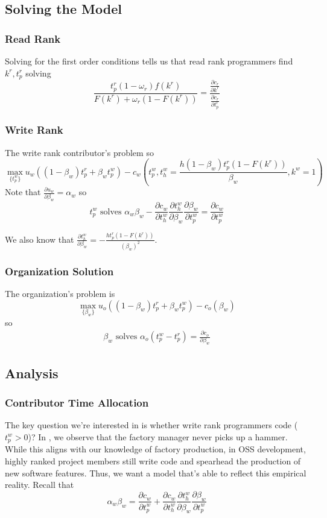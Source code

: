 \documentclass[source/paper/main.tex]{subfiles}
\begin{document}
\subsection{Solving the Model}
\subsubsection{Read Rank}
Solving for the first order conditions tells us that read rank programmers find $k^r, t_p^r$ solving 
$$\frac{t_p^r(1-\omega_r)f(k^r)}{F(k^r) + \omega_r(1-F(k^r)) } = \frac{\frac{\partial c_r}{\partial k^r}}{\frac{\partial c_r}{\partial t_p^r}}$$
\subsubsection{Write Rank}
The write rank contributor's problem so
$$\max_{\{t_p^w\}} u_w\left((1-\beta_w) t_p^r + \beta_w t_p^w \right) - c_w\left(t_p^w, t_h^w = \frac{ h (1-\beta_w) t_p^r(1-F(k^r))}{\beta_w}, k^w = 1\right)$$
Note that $\frac{\partial u_w}{\partial \beta_w} = \alpha_w$ 
so $$t_p^w \text{ solves } \alpha_w \beta_w - \frac{\partial c_w}{\partial t_h^w} \frac{\partial t_h^w}{\partial \beta_w}\frac{\partial \beta_w}{\partial t_p^w} = \frac{\partial c_w}{\partial t_p^w} $$

We also know that $\frac{\partial t_h^w}{\partial \beta_w} = - \frac{h t_p^r (1-F(k^r))}{(\beta_w)^2}$.
\subsubsection{Organization Solution}
The organization's problem is 
$$\max_{\{\beta_w\}} u_o\left((1-\beta_w) t_p^r + \beta_w t_p^w\right) - c_o(\beta_w)$$ 
so 
\begin{align}
    \beta_w \text{ solves } \alpha_o(t_p^w - t_p^r) = \frac{\partial c_o}{\partial \beta_w} \label{org_solution}
\end{align}


\subsection{Analysis}
\subsubsection{Contributor Time Allocation}
The key question we're interested in is whether write rank programmers code ($t_p^w>0$)? In \cite{garicano_hierarchies_2000}, we observe that the factory manager never picks up a hammer. While this aligns with our knowledge of factory production, in OSS development, highly ranked project members still write code and spearhead the production of new software features. Thus, we want a model that's able to reflect this empirical reality. 
Recall that $$\alpha_w \beta_w = \frac{\partial c_w}{\partial t_p^w} + \frac{\partial c_w}{\partial t_h^w}\frac{\partial t_h^w}{\partial \beta_w}\frac{\partial \beta_w}{\partial t_p^w}$$
\end{document}
